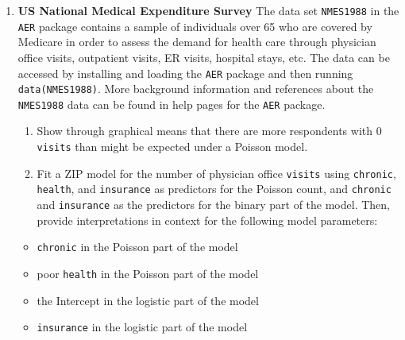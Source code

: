 \documentclass[
]{krantz}
\providecommand{\tightlist}{%
  \setlength{\itemsep}{0pt}\setlength{\parskip}{0pt}}
\begin{document}
\begin{enumerate}
\def\labelenumi{\arabic{enumi}.}
\setcounter{enumi}{5}
\item
  \textbf{US National Medical Expenditure Survey} The data set \texttt{NMES1988} in the \texttt{AER} package contains a sample of individuals over 65 who are covered by Medicare in order to assess the demand for health care through physician office visits, outpatient visits, ER visits, hospital stays, etc. The data can be accessed by installing and loading the \texttt{AER} package and then running \texttt{data(NMES1988)}. More background information and references about the \texttt{NMES1988} data can be found in help pages for the \texttt{AER} package.

  \begin{enumerate}
  \def\labelenumii{\alph{enumii}.}
  \tightlist
  \item
    Show through graphical means that there are more respondents with 0 \texttt{visits} than might be expected under a Poisson model.
  \item
    Fit a ZIP model for the number of physician office \texttt{visits} using \texttt{chronic}, \texttt{health}, and \texttt{insurance} as predictors for the Poisson count, and \texttt{chronic} and \texttt{insurance} as the predictors for the binary part of the model. Then, provide interpretations in context for the following model parameters:
  \end{enumerate}

  \begin{itemize}
  \tightlist
  \item
    \texttt{chronic} in the Poisson part of the model
  \item
    poor \texttt{health} in the Poisson part of the model
  \item
    the Intercept in the logistic part of the model
  \item
    \texttt{insurance} in the logistic part of the model
  \end{itemize}


\end{enumerate}
\end{document}

